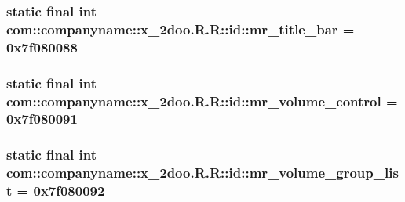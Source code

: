 \hypertarget{classcom_1_1companyname_1_1x__2doo_1_1_r_1_1id_e87fcb723994f73aa7d592af3955afa7}{
\subsubsection[{mr\_\-title\_\-bar}]{\setlength{\rightskip}{0pt plus 5cm}static final int com::companyname::x\_\-2doo.R.R::id::mr\_\-title\_\-bar = 0x7f080088}}
\label{classcom_1_1companyname_1_1x__2doo_1_1_r_1_1id_e87fcb723994f73aa7d592af3955afa7}


\hypertarget{classcom_1_1companyname_1_1x__2doo_1_1_r_1_1id_79832c6bdb916e57a879a3acfadc6708}{
\subsubsection[{mr\_\-volume\_\-control}]{\setlength{\rightskip}{0pt plus 5cm}static final int com::companyname::x\_\-2doo.R.R::id::mr\_\-volume\_\-control = 0x7f080091}}
\label{classcom_1_1companyname_1_1x__2doo_1_1_r_1_1id_79832c6bdb916e57a879a3acfadc6708}


\hypertarget{classcom_1_1companyname_1_1x__2doo_1_1_r_1_1id_5c5a36e9cdd2e532ea8e6162a9b08b5e}{
\subsubsection[{mr\_\-volume\_\-group\_\-list}]{\setlength{\rightskip}{0pt plus 5cm}static final int com::companyname::x\_\-2doo.R.R::id::mr\_\-volume\_\-group\_\-list = 0x7f080092}}
\label{classcom_1_1companyname_1_1x__2doo_1_1_r_1_1id_5c5a36e9cdd2e532ea8e6162a9b08b5e}


